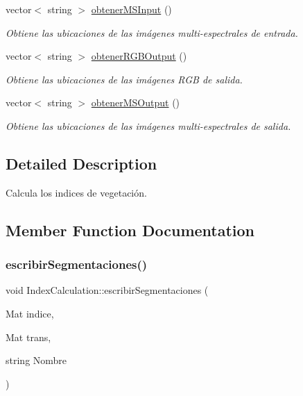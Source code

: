 \begin{DoxyCompactItemize}
vector$<$ string $>$ \mbox{\hyperlink{classIndexCalculation_a889a95c13bc480c1194016ca0e1e9559}{obtener\+M\+S\+Input}} ()
\begin{DoxyCompactList}\small\item\em Obtiene las ubicaciones de las imágenes multi-\/espectrales de entrada. \end{DoxyCompactList}\item 
vector$<$ string $>$ \mbox{\hyperlink{classIndexCalculation_a23a9f9a23db086109989fb93450a70d7}{obtener\+R\+G\+B\+Output}} ()
\begin{DoxyCompactList}\small\item\em Obtiene las ubicaciones de las imágenes R\+GB de salida. \end{DoxyCompactList}\item 
vector$<$ string $>$ \mbox{\hyperlink{classIndexCalculation_a43b986cd58175d47714a399e7fdfd7e3}{obtener\+M\+S\+Output}} ()
\begin{DoxyCompactList}\small\item\em Obtiene las ubicaciones de las imágenes multi-\/espectrales de salida. \end{DoxyCompactList}\end{DoxyCompactItemize}


\subsection{Detailed Description}
Calcula los indices de vegetación. 

\subsection{Member Function Documentation}
\mbox{\label{classIndexCalculation_ae6a53e31c25458fd8c189e21fb89d80a}} 
\subsubsection{\texorpdfstring{escribir\+Segmentaciones()}{escribirSegmentaciones()}}
{\footnotesize\ttfamily void Index\+Calculation\+::escribir\+Segmentaciones (\begin{DoxyParamCaption}\item[{Mat}]{indice,  }\item[{Mat}]{trans,  }\item[{string}]{Nombre }\end{DoxyParamCaption})\hspace{0.3cm}{\ttfamily [inline]}}



